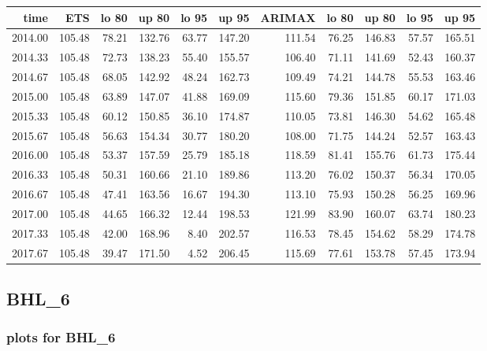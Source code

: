 \documentclass[10pt,a4paper]{article}\usepackage[]{graphicx}\usepackage[]{color}
\newcommand{\AaA}{\_}
\begin{document}
\begin{table}[ht]
\centering
\begin{tabular}{rrrrrrrrrrr}
  \hline
time & ETS  & lo 80 & up 80 & lo 95 & up 95 & ARIMAX  & lo 80 & up 80 & lo 95 & up 95 \\ 
  \hline
2014.00 & 105.48 & 78.21 & 132.76 & 63.77 & 147.20 & 111.54 & 76.25 & 146.83 & 57.57 & 165.51 \\ 
  2014.33 & 105.48 & 72.73 & 138.23 & 55.40 & 155.57 & 106.40 & 71.11 & 141.69 & 52.43 & 160.37 \\ 
  2014.67 & 105.48 & 68.05 & 142.92 & 48.24 & 162.73 & 109.49 & 74.21 & 144.78 & 55.53 & 163.46 \\ 
  2015.00 & 105.48 & 63.89 & 147.07 & 41.88 & 169.09 & 115.60 & 79.36 & 151.85 & 60.17 & 171.03 \\ 
  2015.33 & 105.48 & 60.12 & 150.85 & 36.10 & 174.87 & 110.05 & 73.81 & 146.30 & 54.62 & 165.48 \\ 
  2015.67 & 105.48 & 56.63 & 154.34 & 30.77 & 180.20 & 108.00 & 71.75 & 144.24 & 52.57 & 163.43 \\ 
  2016.00 & 105.48 & 53.37 & 157.59 & 25.79 & 185.18 & 118.59 & 81.41 & 155.76 & 61.73 & 175.44 \\ 
  2016.33 & 105.48 & 50.31 & 160.66 & 21.10 & 189.86 & 113.20 & 76.02 & 150.37 & 56.34 & 170.05 \\ 
  2016.67 & 105.48 & 47.41 & 163.56 & 16.67 & 194.30 & 113.10 & 75.93 & 150.28 & 56.25 & 169.96 \\ 
  2017.00 & 105.48 & 44.65 & 166.32 & 12.44 & 198.53 & 121.99 & 83.90 & 160.07 & 63.74 & 180.23 \\ 
  2017.33 & 105.48 & 42.00 & 168.96 & 8.40 & 202.57 & 116.53 & 78.45 & 154.62 & 58.29 & 174.78 \\ 
  2017.67 & 105.48 & 39.47 & 171.50 & 4.52 & 206.45 & 115.69 & 77.61 & 153.78 & 57.45 & 173.94 \\ 
   \hline
\end{tabular}
\end{table}

\newpage
\subsection{BHL\AaA 6}
\subsubsection{plots for BHL\AaA 6}
\end{document}
